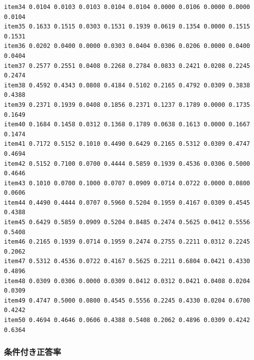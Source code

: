 \documentclass[
  a4paper,
]{ltjsbook}
\newenvironment{Shaded}{\begin{snugshade}}{\end{snugshade}}
\newcommand{\NormalTok}[1]{\textcolor[rgb]{0.00,0.23,0.31}{#1}}
\newcommand{\SpecialCharTok}[1]{\textcolor[rgb]{0.37,0.37,0.37}{#1}}
\begin{document}
\begin{verbatim}
item34 0.0104 0.0103 0.0103 0.0104 0.0104 0.0000 0.0106 0.0000 0.0000 0.0104
item35 0.1633 0.1515 0.0303 0.1531 0.1939 0.0619 0.1354 0.0000 0.1515 0.1531
item36 0.0202 0.0400 0.0000 0.0303 0.0404 0.0306 0.0206 0.0000 0.0400 0.0404
item37 0.2577 0.2551 0.0408 0.2268 0.2784 0.0833 0.2421 0.0208 0.2245 0.2474
item38 0.4592 0.4343 0.0808 0.4184 0.5102 0.2165 0.4792 0.0309 0.3838 0.4388
item39 0.2371 0.1939 0.0408 0.1856 0.2371 0.1237 0.1789 0.0000 0.1735 0.1649
item40 0.1684 0.1458 0.0312 0.1368 0.1789 0.0638 0.1613 0.0000 0.1667 0.1474
item41 0.7172 0.5152 0.1010 0.4490 0.6429 0.2165 0.5312 0.0309 0.4747 0.4694
item42 0.5152 0.7100 0.0700 0.4444 0.5859 0.1939 0.4536 0.0306 0.5000 0.4646
item43 0.1010 0.0700 0.1000 0.0707 0.0909 0.0714 0.0722 0.0000 0.0800 0.0606
item44 0.4490 0.4444 0.0707 0.5960 0.5204 0.1959 0.4167 0.0309 0.4545 0.4388
item45 0.6429 0.5859 0.0909 0.5204 0.8485 0.2474 0.5625 0.0412 0.5556 0.5408
item46 0.2165 0.1939 0.0714 0.1959 0.2474 0.2755 0.2211 0.0312 0.2245 0.2062
item47 0.5312 0.4536 0.0722 0.4167 0.5625 0.2211 0.6804 0.0421 0.4330 0.4896
item48 0.0309 0.0306 0.0000 0.0309 0.0412 0.0312 0.0421 0.0408 0.0204 0.0309
item49 0.4747 0.5000 0.0800 0.4545 0.5556 0.2245 0.4330 0.0204 0.6700 0.4242
item50 0.4694 0.4646 0.0606 0.4388 0.5408 0.2062 0.4896 0.0309 0.4242 0.6364
\end{verbatim}

\subsubsection{条件付き正答率}\label{ux6761ux4ef6ux4ed8ux304dux6b63ux7b54ux7387}

\begin{Shaded}
\end{Shaded}
\end{document}
